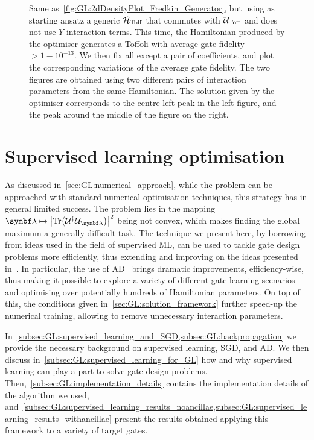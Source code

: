 \begin{figure}[tbh]
\begin{minipage}{0.45\linewidth}
    \end{minipage}
    \caption{
        Same as~\cref{fig:GL:2dDensityPlot_Fredkin_Generator}, but using as starting ansatz a generic $\tilde{{\mathcal{H}}}_{\operatorname{Toff}}$ that commutes with ${\mathcal{U}}_{\operatorname{Toff}}$ and does not use $Y$ interaction terms.
        This time, the Hamiltonian produced by the optimiser generates a Toffoli with average gate fidelity $>1- 10^{-13}$.
        We then fix all except a pair of coefficients, and plot the corresponding variations of the average gate fidelity. The two figures are obtained using two different pairs of interaction parameters from the same Hamiltonian.
        The solution given by the optimiser corresponds to the centre-left peak in the left figure, and the peak around the middle of the figure on the right.
    }
    \label{fig:GL:2dDensityPlot_Toffoli_Generator}
\end{figure}


\section{Supervised learning optimisation}
\label{sec:GL:supervised_learning}

As discussed in~\cref{sec:GL:numerical_approach}, while the problem can be approached with standard numerical optimisation techniques, this strategy has in general limited success.
The problem lies in the mapping $\bslambda\mapsto\abs{\Tr(\calU^\dagger \calU_{\bslambda})}^2$ being not convex, which makes finding the global maximum a generally difficult task.
The technique we present here, by borrowing from ideas used in the field of supervised ML, can be used  to tackle gate design problems more efficiently, thus extending and improving on the ideas presented in~\cite{banchi2016quantum}.
In particular, the use of \ac{AD}~\cite{baydin2018automatic,bartholomewbiggs2000automatic,wengert1964a,bischof2008advances} brings dramatic improvements, efficiency-wise, thus making it possible to explore a variety of different gate learning scenarios and optimising over potentially hundreds of Hamiltonian parameters.
On top of this, the conditions given in~\cref{sec:GL:solution_framework} further speed-up the numerical training, allowing to remove unnecessary interaction parameters.

In~\cref{subsec:GL:supervised_learning_and_SGD,subsec:GL:backpropagation} we provide the necessary background on supervised learning, SGD, and AD. We then discuss in~\cref{subsec:GL:supervised_learning_for_GL} how and why supervised learning can play a part to solve gate design problems.
Then,~\cref{subsec:GL:implementation_details} contains the implementation details of the algorithm we used, and~\cref{subsec:GL:supervised_learning_results_noancillae,subsec:GL:supervised_learning_results_withancillae} present the results obtained applying this framework to a variety of target gates.

